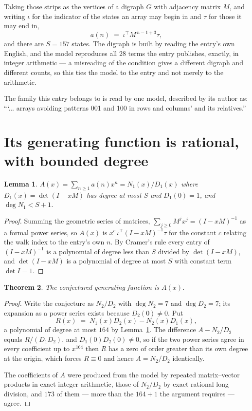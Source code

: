 \documentclass[11pt,a4paper]{article}
\theoremstyle{plain}
\newtheorem{theorem}{Theorem}
\newtheorem{lemma}[theorem]{Lemma}
\theoremstyle{definition}
\begin{document}
Taking those strips as the vertices of a digraph $G$ with adjacency matrix $M$, and writing
$\iota$ for the indicator of the states an array may begin in and $\tau$ for those it may end
in,
\[
a(n)\;=\;\iota^{\!\top}M^{\,n-1+3}\tau ,
\]
and there are $S=157$ states. The digraph is built by reading the entry's own English, and the
model reproduces all $28$ terms the entry publishes, exactly, in integer arithmetic --- a
misreading of the condition gives a different digraph and different counts, so this ties the
model to the entry and not merely to the arithmetic.

The family this entry belongs to is read by one model, described by its author as: ```... arrays avoiding patterns 001 and 100 in rows and columns' and its relatives.''


\section{Its generating function is rational, with bounded degree}

\begin{lemma}\label{lem:rat}
$A(x)=\sum_{n\ge1}a(n)x^n=N_1(x)/D_1(x)$ where $D_1(x)=\det(I-xM)$ has degree at most
$S$ and $D_1(0)=1$, and $\deg N_1<S+1$.
\end{lemma}

\begin{proof}
Summing the geometric series of matrices, $\sum_{j\ge0}M^jx^j=(I-xM)^{-1}$ as a formal
power series, so $A(x)$ is $x^{c}\,\iota^{\!\top}(I-xM)^{-1}\tau$ for the constant $c$
relating the walk index to the entry's own $n$. By Cramer's rule every entry of
$(I-xM)^{-1}$ is a polynomial of degree less than $S$ divided by $\det(I-xM)$, and
$\det(I-xM)$ is a polynomial of degree at most $S$ with constant term $\det I=1$.
\end{proof}

\begin{theorem}
The conjectured generating function is $A(x)$.
\end{theorem}

\begin{proof}
Write the conjecture as $N_2/D_2$ with $\deg N_2=7$ and $\deg D_2=7$; its expansion as a
power series exists because $D_2(0)\neq0$. Put
\[
R(x)\;=\;N_1(x)D_2(x)-N_2(x)D_1(x),
\]
a polynomial of degree at most $164$ by Lemma~\ref{lem:rat}. The difference
$A-N_2/D_2$ equals $R/(D_1D_2)$, and $D_1(0)D_2(0)\neq0$, so if the two power series agree in
every coefficient up to $x^{164}$ then $R$ has a zero of order greater than its own
degree at the origin, which forces $R\equiv0$ and hence $A=N_2/D_2$ identically.

The coefficients of $A$ were produced from the model by repeated matrix--vector products in
exact integer arithmetic, those of $N_2/D_2$ by exact rational long division, and $173$
of them --- more than the $164+1$ the argument requires --- agree.
\end{proof}
\end{document}
